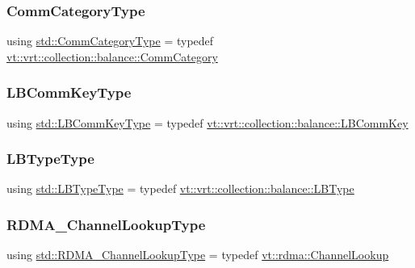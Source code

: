 \subsubsection{\texorpdfstring{Comm\+Category\+Type}{CommCategoryType}}
{\footnotesize\ttfamily using \hyperlink{namespacevt_1_1vrt_1_1collection_1_1balance_a9cc6c6884ca0416dae824e9204093c57}{std\+::\+Comm\+Category\+Type} = typedef \hyperlink{namespacevt_1_1vrt_1_1collection_1_1balance_a9cc6c6884ca0416dae824e9204093c57}{vt\+::vrt\+::collection\+::balance\+::\+Comm\+Category}}

\mbox{\label{namespacestd_a3a6802ab62d3595b44a8463f8e654c31}} 
\subsubsection{\texorpdfstring{L\+B\+Comm\+Key\+Type}{LBCommKeyType}}
{\footnotesize\ttfamily using \hyperlink{namespacestd_a3a6802ab62d3595b44a8463f8e654c31}{std\+::\+L\+B\+Comm\+Key\+Type} = typedef \hyperlink{structvt_1_1vrt_1_1collection_1_1balance_1_1_l_b_comm_key}{vt\+::vrt\+::collection\+::balance\+::\+L\+B\+Comm\+Key}}

\mbox{\label{namespacestd_ae3c14c256fabd8bbed83c439b367c3d8}} 
\subsubsection{\texorpdfstring{L\+B\+Type\+Type}{LBTypeType}}
{\footnotesize\ttfamily using \hyperlink{namespacevt_1_1vrt_1_1collection_1_1balance_ac4f99693509affcc67db182d4aad9b5c}{std\+::\+L\+B\+Type\+Type} = typedef \hyperlink{namespacevt_1_1vrt_1_1collection_1_1balance_ac4f99693509affcc67db182d4aad9b5c}{vt\+::vrt\+::collection\+::balance\+::\+L\+B\+Type}}

\mbox{\label{namespacestd_a30c426bd959ae4c3814e36d01efe9df7}} 
\subsubsection{\texorpdfstring{R\+D\+M\+A\+\_\+\+Channel\+Lookup\+Type}{RDMA\_ChannelLookupType}}
{\footnotesize\ttfamily using \hyperlink{namespacestd_a30c426bd959ae4c3814e36d01efe9df7}{std\+::\+R\+D\+M\+A\+\_\+\+Channel\+Lookup\+Type} = typedef \hyperlink{structvt_1_1rdma_1_1_channel_lookup}{vt\+::rdma\+::\+Channel\+Lookup}}


